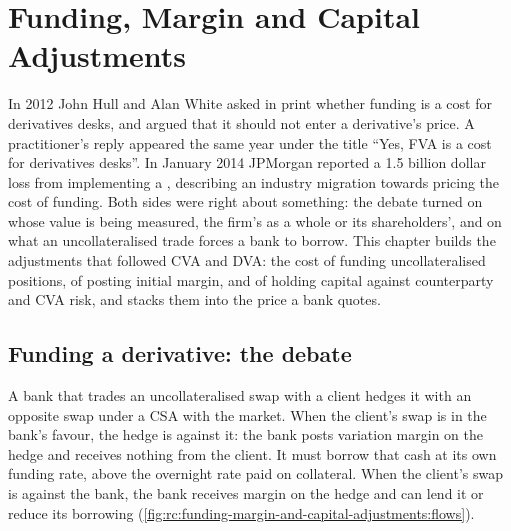 \chapter{Funding, Margin and Capital Adjustments}\label{ch:rc:funding-margin-and-capital-adjustments}

In 2012 John Hull and Alan White asked in print whether funding is a cost for derivatives
desks, and argued that it should not enter a derivative's price. A practitioner's reply
appeared the same year under the title ``Yes, FVA is a cost for derivatives desks''. In January
2014 JPMorgan reported a 1.5 billion dollar loss from implementing a ,
describing an industry migration towards pricing the cost of funding. Both sides were right about something: the debate turned on whose
value is being measured, the firm's as a whole or its shareholders', and on what an
uncollateralised trade forces a bank to borrow. This chapter builds the adjustments that
followed CVA and DVA: the cost of funding uncollateralised positions, of posting initial
margin, and of holding capital against counterparty and CVA risk, and stacks them into the
price a bank quotes.

\section{Funding a derivative: the debate}

A bank that trades an uncollateralised swap with a client hedges it with an opposite swap
under a CSA with the market. When the client's swap is in the bank's favour, the hedge is
against it: the bank posts variation margin on the hedge and receives nothing from the
client. It must borrow that cash at its own funding rate, above the overnight rate paid on
collateral. When the client's swap is against the bank, the bank receives margin on the
hedge and can lend it or reduce its borrowing
(\cref{fig:rc:funding-margin-and-capital-adjustments:flows}).

